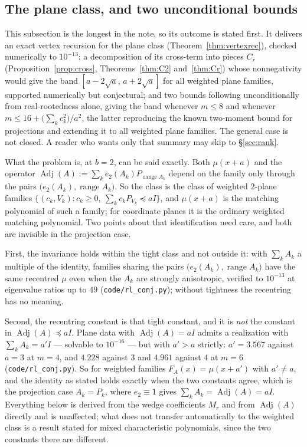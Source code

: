 \documentclass[11pt]{article}
\theoremstyle{remark}
\begin{document}
\subsection{The plane class, and two unconditional bounds}

This subsection is the longest in the note, so its outcome is stated first. It delivers an exact
vertex recursion for the plane class (Theorem~\ref{thm:vertexrec}), checked numerically to
$10^{-13}$; a decomposition of its cross-term into pieces $C_r$ (Proposition~\ref{prop:cross},
Theorems~\ref{thm:C2} and~\ref{thm:Cr}) whose nonnegativity would give the band
$[a-2\sqrt a,\,a+2\sqrt a]$ for all weighted plane families, supported numerically but
conjectural; and two bounds following unconditionally from real-rootedness alone, giving the band
whenever $m\le8$ and whenever $m\le16+\bigl(\sum_kc_k^2\bigr)/a^2$, the latter reproducing the
known two-moment bound for projections and extending it to all weighted plane families. The
general case is not closed. A reader who wants only that summary may skip to \S\ref{sec:rank}.

What the problem is, at $b=2$, can be said exactly. Both $\mu(x+a)$ and the operator
$\operatorname{Adj}(A):=\sum_k e_2(A_k)P_{\operatorname{range}A_k}$ depend on the
family only through the pairs $\bigl(e_2(A_k),\operatorname{range}A_k\bigr)$. So the
class is the class of weighted $2$-plane families
$\{(c_k,V_k):c_k\ge0,\ \sum_kc_kP_{V_k}\preceq aI\}$, and $\mu(x+a)$ is the matching
polynomial of such a family; for coordinate planes it is the ordinary weighted
matching polynomial. Two points about that identification need care, and both are invisible in
the projection case.

First, the invariance holds within the tight class and not outside it: with $\sum_kA_k$ a
multiple of the identity, families sharing the pairs
$\bigl(e_2(A_k),\operatorname{range}A_k\bigr)$ have the same recentred $\mu$ even when the $A_k$
are strongly anisotropic, verified to $10^{-13}$ at eigenvalue ratios up to $49$
(\texttt{code/rl\_conj.py}); without tightness the recentring has no meaning.

Second, the recentring constant is that tight constant, and it is \emph{not} the constant in
$\operatorname{Adj}(A)\preceq aI$. Plane data with $\operatorname{Adj}(A)=aI$ admits a
realization with $\sum_kA_k=a'I$ --- solvable to $10^{-16}$ --- but with $a'>a$ strictly:
$a'=3.567$ against $a=3$ at $m=4$, and $4.228$ against $3$ and $4.961$ against $4$ at $m=6$
(\texttt{code/rl\_conj.py}). So for weighted families $F_A(x)=\mu(x+a')$ with $a'\ne a$, and the
identity as stated holds exactly when the two constants agree, which is the projection case
$A_k=P_k$, where $e_2\equiv1$ gives $\sum_kA_k=\operatorname{Adj}(A)=aI$. Everything below is
derived from the wedge coefficients $M_r$ and from $\operatorname{Adj}(A)$ directly and is
unaffected; what does not transfer automatically to the weighted class is a result stated for
mixed characteristic polynomials, since the two constants there are different.
\end{document}
